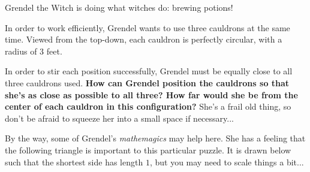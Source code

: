 


Grendel the Witch is doing what witches do: brewing potions!

In order to work efficiently, Grendel wants to use three cauldrons at
the same time. Viewed from the top-down, each cauldron is perfectly
circular, with a radius of \(3\) feet.

\begin{center}
\end{center}

In order to stir each position successfully, Grendel must be equally close
to all three cauldrons used.
\textbf{How can Grendel position the cauldrons so that she's as close as
possible to all three? How far would she be from the center of
each cauldron in this configuration?} She's a frail old thing, so don't
be afraid to squeeze her into a small space if necessary...

By the way,
some of Grendel's \textit{mathemagics} may help here. She has a feeling
that the following triangle is important to this particular puzzle.
It is drawn below such that the shortest side has length \(1\), but you
may need to scale things a bit...


\begin{center}
\end{center}

